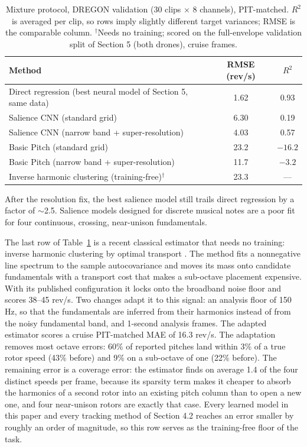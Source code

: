 \documentclass[journal]{IEEEtran}
\begin{document}
\begin{table}[t]
  \centering
  \caption{Mixture protocol, DREGON validation (30 clips $\times$ 8
    channels), PIT-matched. $R^2$ is averaged per clip, so rows imply
    slightly different target variances; RMSE is the comparable column.
    $^{\dagger}$Needs no training; scored on the full-envelope validation
    split of Section 5 (both drones), cruise frames.}
  \label{tab:multipitch}
  \footnotesize
  \setlength{\tabcolsep}{4pt}
  \begin{tabular}{@{}p{}cc@{}}
    \toprule
    Method & RMSE (rev/s) & $R^2$ \\
    \midrule
    Direct regression (best neural model of Section 5, same data)
      & 1.62 & 0.93 \\
    Salience CNN (standard grid) & 6.30 & 0.19 \\
    Salience CNN (narrow band + super-resolution) & 4.03 & 0.57 \\
    Basic Pitch (standard grid) & 23.2 & $-16.2$ \\
    Basic Pitch (narrow band + super-resolution) & 11.7 & $-3.2$ \\
    Inverse harmonic clustering (training-free)$^{\dagger}$
      & 23.3 & --- \\
    \bottomrule
  \end{tabular}
\end{table}

After the resolution fix, the best salience model still trails direct
regression by a factor of $\sim$2.5. Salience models designed for discrete
musical notes are a poor fit for four continuous, crossing, near-unison
fundamentals.

The last row of Table~\ref{tab:multipitch} is a recent classical estimator
that needs no training: inverse harmonic clustering by optimal transport
\cite{bjorkman2026ihc}. The method
fits a nonnegative line spectrum to the sample autocovariance and moves its
mass onto candidate fundamentals with a transport cost that makes a
sub-octave placement expensive. With its published configuration it locks
onto the broadband noise floor and scores 38--45 rev/s. Two changes adapt
it to this signal: an analysis floor of 150 Hz, so that the fundamentals are
inferred from their harmonics instead of from the noisy fundamental band,
and 1-second analysis frames. The adapted estimator scores a cruise
PIT-matched MAE of 16.3 rev/s. The adaptation removes most octave errors:
60\% of reported pitches land within 3\% of a true rotor speed (43\% before)
and 9\% on a sub-octave of one (22\% before). The remaining error is a
coverage error: the estimator finds on average 1.4 of the four distinct
speeds per frame, because its sparsity term makes it cheaper to absorb the
harmonics of a second rotor into an existing pitch column than to open a new
one, and four near-unison rotors are exactly that case. Every learned model
in this paper and every tracking method of Section 4.2 reaches an error
smaller by roughly an order of magnitude, so this row serves as the
training-free floor of the task.
\end{document}

